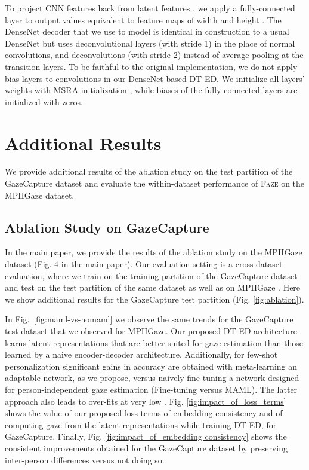 \documentclass[10pt,twocolumn,letterpaper]{article}
\newcommand{\faze}[0]{\textsc{Faze}\xspace}
\begin{document}
To project CNN features back from latent features , we apply a fully-connected layer to output values equivalent to  feature maps of width  and height .
The DenseNet decoder that we use to model  is identical in construction to a usual DenseNet but uses deconvolutional layers (with stride 1) in the place of normal convolutions, and  deconvolutions (with stride 2) instead of average pooling at the transition layers.
To be faithful to the original implementation, we do not apply bias layers to convolutions in our DenseNet-based DT-ED.
We initialize all layers' weights with MSRA initialization \cite{He2015ICCV}, while biases of the fully-connected layers are initialized with zeros.

\section{Additional Results}
\noindent
We provide additional results of the ablation study on the test partition of the GazeCapture dataset and evaluate the within-dataset performance of \faze on the MPIIGaze dataset.

\subsection{Ablation Study on GazeCapture}
\label{sec:ablation}
\noindent
In the main paper, we provide the results of the ablation study on the MPIIGaze dataset (Fig. 4 in the main paper). Our evaluation setting is a cross-dataset evaluation, where we train on the training partition of the GazeCapture dataset \cite{Krafka2016CVPR} and test on the test partition of the same dataset as well as on MPIIGaze \cite{Zhang2015CVPR}. Here we show additional results for the GazeCapture test partition (Fig. \ref{fig:ablation}).


In Fig.~\ref{fig:maml-vs-nomaml} we observe the same trends for the GazeCapture test dataset that we observed for MPIIGaze. Our proposed DT-ED architecture learns latent representations that are better suited for gaze estimation than those learned by a naive encoder-decoder architecture. Additionally, for few-shot personalization significant gains in accuracy are obtained with meta-learning an adaptable network, as we propose, versus naively fine-tuning a network designed for person-independent gaze estimation (Fine-tuning versus MAML). The latter approach also leads to over-fits at very low . Fig. \ref{fig:impact_of_loss_terms} shows the value of our proposed loss terms of embedding consistency and of computing gaze from the latent representations while training DT-ED, for GazeCapture. Finally, Fig. \ref{fig:impact_of_embedding consistency} shows the consistent improvements obtained for the GazeCapture dataset by preserving inter-person differences versus not doing so.
\end{document}
